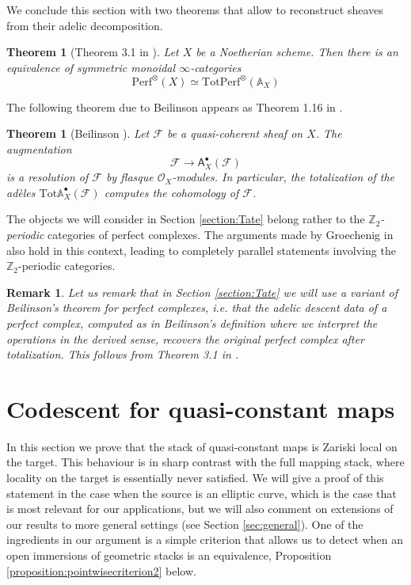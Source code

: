 \documentclass[11pt,letterpaper]{amsart}
\newtheorem{theorem}[dummy]{Theorem}
\newtheorem{remark}[dummy]{Remark}
\newcommand{\bfA}{\mathsf{A}}
\newcommand{\bA}{\mathbb{A}}
\newcommand{\bZ}{\mathbb{Z}}
\newcommand{\cF}{\mathcal{F}}
\newcommand{\cO}{\mathcal{O}}
\newcommand{\Tot}{\mathrm{Tot}}
\newcommand{\Perf}{\mathrm{Perf}}
\begin{document}
We conclude this section with two theorems that allow to reconstruct sheaves from their adelic decomposition.

\begin{theorem}[Theorem 3.1 in \cite{Groech}]
Let $X$ be a Noetherian scheme. Then there is an equivalence of symmetric monoidal $\infty$-categories
$$\Perf^{\otimes}(X)\simeq\Tot\Perf^{\otimes}(\bA_{X})$$
\end{theorem}

The following theorem due to Beilinson appears as Theorem 1.16 in \cite{Groech}.
\begin{theorem}[Beilinson \cite{BeilAd}]
Let $\cF$ be a quasi-coherent sheaf on $X$. The augmentation $$\cF\to\bfA_{X}^{\bullet}(\cF)$$ is a resolution of $\cF$ by flasque $\cO_X$-modules. In particular, the totalization of the ad\`eles $\Tot \bA_{X}^{\bullet}(\cF)$ computes the cohomology of $\cF$.
\end{theorem}

The objects we will consider in Section \ref{section:Tate} belong rather to the \emph{$\bZ_2$-periodic} categories of perfect complexes. The arguments made by Groechenig in \cite{Groech} also hold in this context, leading to completely parallel statements involving the $\bZ_2$-periodic categories.
\begin{remark}
Let us remark that in Section \ref{section:Tate} we will use a variant of Beilinson's theorem for perfect complexes, i.e. that the adelic descent data of a perfect complex, computed as in Beilinson's definition where we interpret the operations in the derived sense, recovers the original perfect complex after totalization. This follows from Theorem 3.1 in \cite{Groech}.
\end{remark}

\section{Codescent for quasi-constant maps}
\label{section:codescentpropstatement}
\label{section:proofcodescent}
In this section we prove that the stack of quasi-constant maps is Zariski local on the target. This behaviour is in sharp contrast with the full mapping stack, where locality on the target is essentially never satisfied.  
We will  give a proof of this statement in the case when the source is an elliptic curve, which is the case that is most relevant for our applications, but we will also comment on  extensions of our results to more general settings (see Section \ref{sec:general}). One of the ingredients in our argument is a simple criterion that allows us to detect when an open immersions of geometric stacks is an equivalence, Proposition \ref{proposition:pointwisecriterion2} below.
\end{document}
